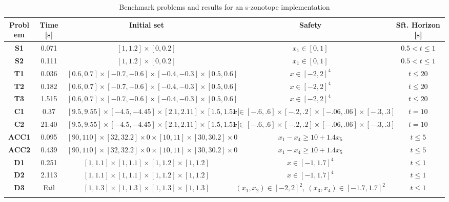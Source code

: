 \documentclass[journal]{IEEEtran}
\begin{document}
\renewcommand{\arraystretch}{1.15}
\begin{table}[t]
\centering
\begin{tabular}{ccccc}
\textbf{Problem} & \textbf{Time} [s] & \textbf{Initial set} & \textbf{Safety} &\textbf{Sft. Horizon} [s]  \\ \hline
\textbf{S1}  & 0.071  & {$[1,1.2] \times [0, 0.2]$} & {$x_1 \in [0,1]$} &  $0.5<t\leq 1$  \\
\textbf{S2} & 0.111 & {$[1,1.2] \times [0, 0.2]$} &  {$x_1 \in [0,1]$} &  $0.5<t\leq 1$ \\ 
\textbf{T1} & 0.036 & $[0.6,0.7]\times[-0.7,-0.6]\times[-0.4, -0.3]\times[0.5,0.6]$ & {$x \in [-2,2]^4$} & $t\leq 20$  \\
\textbf{T2} & 0.182 & $[0.6,0.7]\times[-0.7,-0.6]\times[-0.4, -0.3]\times[0.5,0.6]$  & {$x \in [-2,2]^4$} & $t\leq 20$ \\
\textbf{T3} & 1.515 & $[0.6,0.7]\times[-0.7,-0.6]\times[-0.4, -0.3]\times[0.5,0.6]$  &  {$x \in [-2,2]^4$}  & $t\leq 20$ \\ 
\textbf{C1}  & 0.37 & {$[9.5,9.55]\times[-4.5,-4.45]\times[2.1, 2.11]\times[1.5,1.51]$} & {$x \in [-.6,.6]\times [-.2, .2] \times [-.06,.06] \times [-.3,.3]$} & $t=10$   \\
\textbf{C2} & 21.40 & {$[9.5,9.55]\times[-4.5,-4.45]\times[2.1, 2.11]\times[1.5,1.51]$} & {$x \in [-.6,.6]\times [-.2, .2] \times [-.06,.06] \times [-.3,.3]$} & $t=10$ \\ 
\textbf{ACC1} & 0.095 & {$[90,110]\times[32,32.2] \times 0 \times [10 , 11] \times [30, 30.2] \times 0$} & {$x_1-x_4 \geq 10 + 1.4x_5$} & $t \leq 5$ \\
\textbf{ACC2} & 0.439 & {$[90,110]\times[32,32.2] \times 0 \times [10 , 11] \times [30, 30.2] \times 0$} & {$x_1-x_4 \geq 10 + 1.4x_5$} & $t \leq 5$  \\ 
\textbf{D1}  & 0.251 & $[1, 1.1]\times [1, 1.1]\times [1, 1.2]\times [1, 1.2] $ & {$x \in [-1,1.7]^4$}  & $t\leq 1$ \\ 
\textbf{D2} & 2.113 & {$[1, 1.1]\times [1, 1.1]\times [1, 1.2]\times [1, 1.2] $} & {$x \in [-1,1.7]^4$}  & $t\leq 1$  \\
\textbf{D3} & Fail & {$[1, 1.3]\times [1, 1.3]\times [1, 1.3]\times [1, 1.3] $} & {$(x_1,x_2) \in [-2,2]^2, \ (x_3,x_4) \in [-1.7,1.7]^2$} &  $t\leq 1$\\
& & & &
\end{tabular}
\caption{Benchmark problems and results for an s-zonotope implementation}
\label{tab:results_benchmark}
\end{table}
\end{document}
